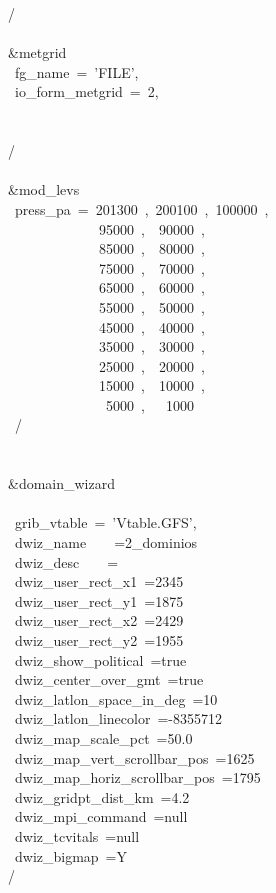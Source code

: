 /\\
\\
\&metgrid\\
~fg\_name~=~'FILE',\\
~io\_form\_metgrid~=~2,\\
\\
\\
/\\
\\
\&mod\_levs\\
~press\_pa~=~201300~,~200100~,~100000~,\\
~~~~~~~~~~~~~95000~,~~90000~,\\
~~~~~~~~~~~~~85000~,~~80000~,\\
~~~~~~~~~~~~~75000~,~~70000~,\\
~~~~~~~~~~~~~65000~,~~60000~,\\
~~~~~~~~~~~~~55000~,~~50000~,\\
~~~~~~~~~~~~~45000~,~~40000~,\\
~~~~~~~~~~~~~35000~,~~30000~,\\
~~~~~~~~~~~~~25000~,~~20000~,\\
~~~~~~~~~~~~~15000~,~~10000~,\\
~~~~~~~~~~~~~~5000~,~~~1000\\
~/\\
\\
\\
\&domain\_wizard\\
\\
~grib\_vtable~=~'Vtable.GFS',\\
~dwiz\_name~~~~=2\_dominios\\
~dwiz\_desc~~~~=\\
~dwiz\_user\_rect\_x1~=2345\\
~dwiz\_user\_rect\_y1~=1875\\
~dwiz\_user\_rect\_x2~=2429\\
~dwiz\_user\_rect\_y2~=1955\\
~dwiz\_show\_political~=true\\
~dwiz\_center\_over\_gmt~=true\\
~dwiz\_latlon\_space\_in\_deg~=10\\
~dwiz\_latlon\_linecolor~=-8355712\\
~dwiz\_map\_scale\_pct~=50.0\\
~dwiz\_map\_vert\_scrollbar\_pos~=1625\\
~dwiz\_map\_horiz\_scrollbar\_pos~=1795\\
~dwiz\_gridpt\_dist\_km~=4.2\\
~dwiz\_mpi\_command~=null\\
~dwiz\_tcvitals~=null\\
~dwiz\_bigmap~=Y\\
/\\



